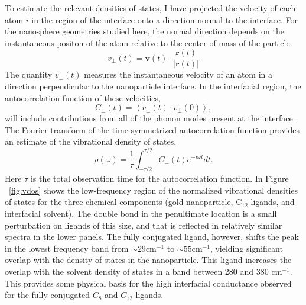 To estimate the relevant densities of states, I have projected the
velocity of each atom $i$ in the region of the interface onto a
direction normal to the interface. For the nanosphere geometries
studied here, the normal direction depends on the instantaneous
positon of the atom relative to the center of mass of the particle.
\begin{equation}
v_\perp(t) = \mathbf{v}(t) \cdot \frac{\mathbf{r}(t)}{\left|\mathbf{r}(t)\right|}
\end{equation}
The quantity $v_\perp(t)$ measures the instantaneous velocity of an
atom in a direction perpendicular to the nanoparticle interface.  In
the interfacial region, the autocorrelation function of these
velocities,
\begin{equation}
  C_\perp(t) = \left< v_\perp(t) \cdot v_\perp(0) \right>,
\end{equation}
will include contributions from all of the phonon modes present at the
interface.  The Fourier transform of the time-symmetrized
autocorrelation function provides an estimate of the vibrational
density of states,\cite{Shin:2010sf}
\begin{equation}
  \rho(\omega) = \frac{1}{\tau} \int_{-\tau/2}^{\tau/2} C_\perp(t) e^{-i
    \omega t} dt.
\end{equation}
Here $\tau$ is the total observation time for the autocorrelation
function.  In Figure ~\ref{fig:vdos} shows the low-frequency region of
the normalized vibrational densities of states for the three chemical
components (gold nanoparticle, C$_{12}$ ligands, and interfacial
solvent).  The double bond in the penultimate location is a small
perturbation on ligands of this size, and that is reflected in
relatively similar spectra in the lower panels.  The fully conjugated
ligand, however, shifts the peak in the lowest frequency band from
$\sim 29 \mathrm{cm}^{-1}$ to $\sim 55 \mathrm{cm}^{-1}$, yielding
significant overlap with the density of states in the nanoparticle.
This ligand increases the overlap with the solvent density of
states in a band between 280 and 380 $\mathrm{cm}^{-1}$.  This
provides some physical basis for the high interfacial conductance
observed for the fully conjugated $C_8$ and $C_{12}$ ligands.

